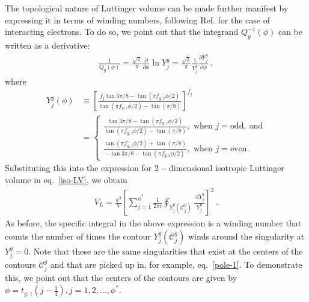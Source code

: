 The topological nature of Luttinger volume can be made further manifest by expressing it in terms of winding numbers, following Ref.\cite{seki2017topological} for the case of interacting electrons. To do so, we point out that the integrand \(Q^{-1}_g(\phi)\) can be written as a derivative:
\begin{equation}\begin{aligned}
	\frac{1}{Q_g(\phi)} = \frac{\sqrt 2}{\pi} \frac{\partial{}}{\partial{\phi}} \ln Y^g_j = \frac{\sqrt 2}{\pi} \frac{1}{Y^g_j}\frac{\partial{Y^g_j}}{\partial{\phi}}~,
\end{aligned}\end{equation}
where 
\begin{equation}\begin{aligned}
	\label{y-def}
	Y^g_j(\phi) &\equiv \left[\frac{f_j \tan 3\pi/8 - \tan \left( \pi f_{g,z} \phi/2 \right)}{\tan \left(\pi f_{g,z} \phi/2 \right) - \tan \left(\pi/8 \right) }\right]^{f_j} \\
		    &= \begin{cases}
			    \frac{\tan 3\pi/8 - \tan \left( \pi f_{g,z} \phi/2 \right)}{\tan \left( \pi f_{g,z} \phi/2 \right) - \tan \left( \pi/8 \right) }, \text{ when }j=\text{odd},~\text{and}\\
			    \frac{\tan \left( \pi f_{g,z} \phi/2 \right) + \tan \left( \pi/8 \right)}{-\tan 3\pi/8 - \tan \left( \pi f_{g,z} \phi/2 \right)}, \text{ when }j=\text{even}~.
	\end{cases}
\end{aligned}\end{equation}
Substituting this into the expression for \(2-\)dimensional isotropic Luttinger volume in eq.~\eqref{iso-LV}, we obtain
\begin{equation}\begin{aligned}
	V_L = \frac{\pi^3}{V}\left[\sum_{j=1}^{\phi^*}\frac{1}{2\pi i}\oint_{Y^g_j(\mathcal{C}_j^g)} \frac{\:\mathrm{d} Y_j^g}{ Y_j^g}\right]^2~.
\end{aligned}\end{equation}
As before, the specific integral in the above expression is a winding number that counts the number of times the contour \(Y_j^g(\mathcal{C}_j^g)\) winds around the singularity at \(Y_j^g=0\). Note that these are the same singularities that exist at the centers of the contours \(\mathcal{C}_j^g\) and that are picked up in, for example, eq.~\eqref{pole-1}. To demonstrate this, we point out that the centers of the contours are given by \(\phi = t_{g,z}\left(j - \frac{1}{4}\right), j =1,2,\ldots,\phi^* \).
